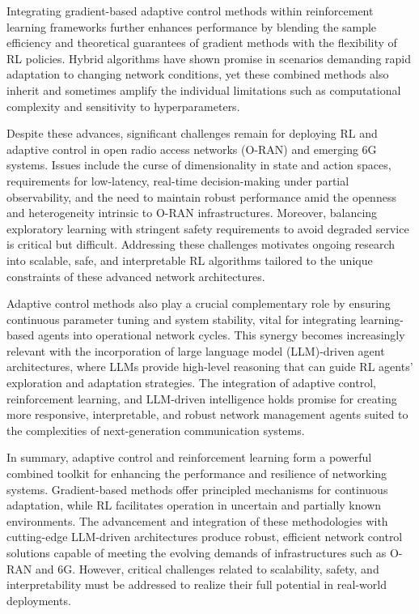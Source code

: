 \documentclass[sigconf]{acmart}
\begin{document}
Integrating gradient-based adaptive control methods within reinforcement learning frameworks further enhances performance by blending the sample efficiency and theoretical guarantees of gradient methods with the flexibility of RL policies. Hybrid algorithms have shown promise in scenarios demanding rapid adaptation to changing network conditions, yet these combined methods also inherit and sometimes amplify the individual limitations such as computational complexity and sensitivity to hyperparameters.

Despite these advances, significant challenges remain for deploying RL and adaptive control in open radio access networks (O-RAN) and emerging 6G systems. Issues include the curse of dimensionality in state and action spaces, requirements for low-latency, real-time decision-making under partial observability, and the need to maintain robust performance amid the openness and heterogeneity intrinsic to O-RAN infrastructures. Moreover, balancing exploratory learning with stringent safety requirements to avoid degraded service is critical but difficult. Addressing these challenges motivates ongoing research into scalable, safe, and interpretable RL algorithms tailored to the unique constraints of these advanced network architectures.

Adaptive control methods also play a crucial complementary role by ensuring continuous parameter tuning and system stability, vital for integrating learning-based agents into operational network cycles. This synergy becomes increasingly relevant with the incorporation of large language model (LLM)-driven agent architectures, where LLMs provide high-level reasoning that can guide RL agents' exploration and adaptation strategies. The integration of adaptive control, reinforcement learning, and LLM-driven intelligence holds promise for creating more responsive, interpretable, and robust network management agents suited to the complexities of next-generation communication systems.

In summary, adaptive control and reinforcement learning form a powerful combined toolkit for enhancing the performance and resilience of networking systems. Gradient-based methods offer principled mechanisms for continuous adaptation, while RL facilitates operation in uncertain and partially known environments. The advancement and integration of these methodologies with cutting-edge LLM-driven architectures produce robust, efficient network control solutions capable of meeting the evolving demands of infrastructures such as O-RAN and 6G. However, critical challenges related to scalability, safety, and interpretability must be addressed to realize their full potential in real-world deployments.
\end{document}
